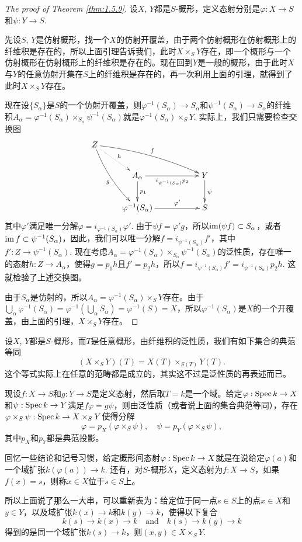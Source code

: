 \begin{proof}[The proof of Theorem \ref{thm:1.5.9}]
设$X$, $Y$都是$S$-概形，定义态射分别是$\varphi:X\to S$和$\psi:Y\to S$. 

先设$S$, $Y$是仿射概形，找一个$X$的仿射开覆盖，由于两个仿射概形在仿射概形上的纤维积是存在的，所以上面引理告诉我们，此时$X\times_S Y$存在，即一个概形与一个仿射概形在仿射概形上的纤维积是存在的。现在回到$Y$是一般的概形，由于此时$X$与$Y$的任意仿射开集在$S$上的纤维积是存在的，再一次利用上面的引理，就得到了此时$X\times_S Y$存在。

现在设$\{S_\alpha\}$是$S$的一个仿射开覆盖，则$\varphi^{-1}(S_\alpha)\to S_\alpha$和$\psi^{-1}(S_\alpha)\to S_\alpha$的纤维积$A_\alpha=\varphi^{-1}(S_\alpha)\times_{S_\alpha}\psi^{-1}(S_\alpha)$就是$\varphi^{-1}(S_\alpha)\times_S Y$. 实际上，我们只需要检查交换图
\[
\begin{xy}
	\xymatrix{
		Z\ar@/_/[rdd]_{g}\ar@/^/[drrr]^{f}\ar@{.>}[dr]^h&&&\\
		&A_\alpha\ar[rr]_-{i_{\psi^{-1}(S_\alpha)}p_2}\ar[d]^{p_1}&&Y\ar[d]^\psi\\
		&\varphi^{-1}(S_\alpha)\ar[rr]^-{\varphi'}&&S
	}
\end{xy}
\]
其中$\varphi'$满足唯一分解$\varphi=i_{\varphi^{-1}(S_\alpha)}\varphi'$. 由于$\psi f=\varphi' g$，所以$\operatorname{im}(\psi f)\subset S_\alpha$，或者$\operatorname{im} f\subset \psi^{-1}(S_\alpha)$，因此，我们可以唯一分解$f=i_{\psi^{-1}(S_\alpha)}f'$，其中$f':Z\to \psi^{-1}(S_\alpha)$. 现在考虑$A_\alpha=\varphi^{-1}(S_\alpha)\times_{S_\alpha}\psi^{-1}(S_\alpha)$的泛性质，存在唯一的态射$h:Z\to A_\alpha$，使得$g=p_1h$且$f'=p_2h$，所以$f=i_{\psi^{-1}(S_\alpha)}f'=i_{\psi^{-1}(S_\alpha)}p_2h$. 这就检验了上述交换图。

由于$S_\alpha$是仿射的，所以$A_\alpha=\varphi^{-1}(S_\alpha)\times_S Y$存在。由于$\bigcup_\alpha\varphi^{-1}(S_\alpha)=\varphi^{-1}\left(\bigcup_\alpha S_\alpha\right)=\varphi^{-1}(S)=X$，所以$\varphi^{-1}(S_\alpha)$是$X$的一个开覆盖，由上面的引理，$X\times_S Y$存在。
\end{proof}

\begin{para}[纤维积下的几何点]
设$X$, $Y$都是$S$-概形，而$T$是任意概形，由纤维积的泛性质，我们有如下集合的典范等同
\[
	(X\times_S Y)(T)=X(T)\times_{S(T)}Y(T).
\]
这个等式实际上在任意的范畴都是成立的，其实这不过是泛性质的再表述而已。

现设$f:X\to S$和$g:Y\to S$是定义态射，然后取$T=k$是一个域。给定$\varphi:\operatorname{Spec} k\to X$和$\psi:\operatorname{Spec} k\to Y$满足$f\varphi=g\psi$，则由泛性质（或者说上面的集合典范等同），存在$\varphi\times_S\psi:\operatorname{Spec} k\to X\times_S Y$使得分解
\[
	\varphi=p_X(\varphi\times_S\psi),\quad \psi=p_Y(\varphi\times_S\psi),
\]
其中$p_X$和$p_Y$都是典范投影。

回忆一些结论和记号习惯，给定概形间态射$\varphi:\operatorname{Spec} k\to X$就是在说给定$\varphi(a)$和一个域扩张$k(\varphi(a))\to k$. 还有，对$S$-概形$X$，定义态射为$f:X\to S$，如果$f(x)=s$，则称$x\in X$位于$s\in S$上。

所以上面说了那么一大串，可以重新表为：给定位于同一点$s\in S$上的点$x\in X$和$y\in Y$，以及域扩张$k(x)\to k$和$k(y)\to k$，使得以下复合
\[
	k(s)\to k(x)\to k \quad \text{and} \quad k(s)\to k(y)\to k
\]
得到的是同一个域扩张$k(s)\to k$，则$(x,y)\in X\times_S Y$. 
\end{para}

